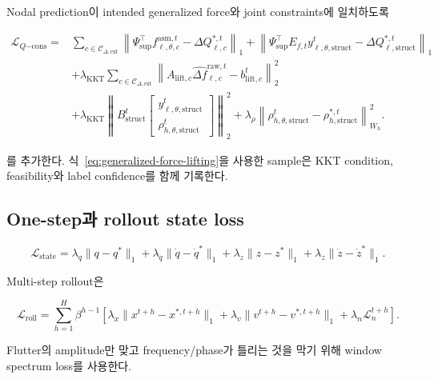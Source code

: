 \documentclass[11pt,a4paper]{article}
\begin{document}
Nodal prediction이 intended generalized force와 joint constraints에 일치하도록

\begin{equation}
\begin{aligned}
  \mathcal L_{Q\mathrm{-cons}}
  ={}&
  \sum_{c\in\mathcal C_{\Delta,\mathrm{ext}}}\left\|
  \Psi_{\mathrm{sup}}^\top f_{\ell,\theta,c}^{\mathrm{asm},t}
  -\Delta Q_{\ell,c}^{*,t}
  \right\|_1
  +\left\|
  \Psi_{\mathrm{sup}}^\top E_{f,t}y_{\ell,\theta,\mathrm{struct}}^t
  -\Delta Q_{\ell,\mathrm{struct}}^{*,t}
  \right\|_1\\
  &+\lambda_{\mathrm{KKT}}
  \sum_{c\in\mathcal C_{\Delta,\mathrm{ext}}}\left\|
  A_{\mathrm{lift},c}
  \widehat{\Delta f}_{\ell,c}^{\mathrm{raw},t}-b_{\mathrm{lift},c}^t
  \right\|_2^2\\
  &+\lambda_{\mathrm{KKT}}
  \left\|
  B_{\mathrm{struct}}^t
  \begin{bmatrix}
    y_{\ell,\theta,\mathrm{struct}}^t\\
    \rho_{h,\theta,\mathrm{struct}}^t
  \end{bmatrix}
  \right\|_2^2
  +\lambda_\rho
  \left\|
  \rho_{h,\theta,\mathrm{struct}}^t
  -\rho_{h,\mathrm{struct}}^{*,t}
  \right\|_{W_h}^2 .
\end{aligned}
\end{equation}

를 추가한다. 식~\eqref{eq:generalized-force-lifting}을 사용한 sample은
KKT condition, feasibility와 label confidence를 함께 기록한다.

\subsection{One-step과 rollout state loss}

\begin{equation}
  \mathcal L_{\mathrm{state}}
  =
  \lambda_q\|q-q^*\|_1
  +\lambda_{\dot q}\|\dot q-\dot q^*\|_1
  +\lambda_z\|z-z^*\|_1
  +\lambda_{\dot z}\|\dot z-\dot z^*\|_1.
\end{equation}

Multi-step rollout은

\begin{equation}
  \mathcal L_{\mathrm{roll}}
  =
  \sum_{h=1}^{H}
  \beta^{h-1}
  \left[
  \lambda_x\|x^{t+h}-x^{*,t+h}\|_1
  +\lambda_v\|v^{t+h}-v^{*,t+h}\|_1
  +\lambda_n\mathcal L_n^{t+h}
  \right].
\end{equation}

Flutter의 amplitude만 맞고 frequency/phase가 틀리는 것을 막기 위해
window spectrum loss를 사용한다.
\end{document}
